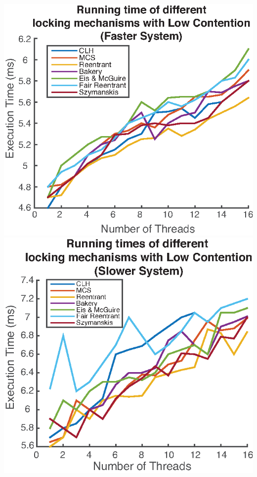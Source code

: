 \documentclass[FinalReport.tex]{subfiles}
\begin{document}
	\includegraphics[scale = .8]{figures/myComp_lowCont16.eps}
	\includegraphics[scale = .8]{figures/evanComp_lowCont.eps}

\bigskip
\end{document}

